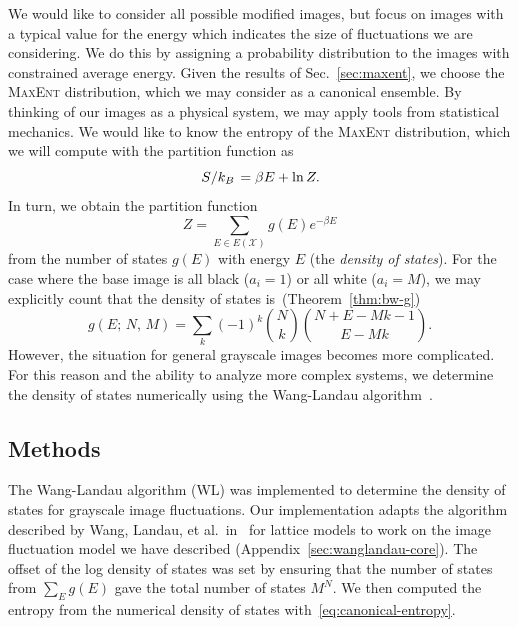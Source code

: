 \documentclass[aps,reprint,floatfix]{revtex4-2}
\renewcommand\mathrm\textnormal%
\theoremstyle{plain}
\theoremstyle{definition}
\renewcommand\ln{\operatorname{\mathrm{ln}}}
\begin{document}
We would like to consider all possible modified images, but focus on images with
a typical value for the energy which indicates the size of fluctuations we are
considering. We do this by assigning a probability distribution to the images
with constrained average energy. Given the results of Sec.~\ref{sec:maxent}, we
choose the \textsc{MaxEnt} distribution, which we may consider as a canonical
ensemble. By thinking of our images as a physical system, we may apply tools
from statistical mechanics. We would like to know the entropy of the
\textsc{MaxEnt} distribution, which we will compute with the partition function as
\begin{equation}
  \flatfrac{S}{k_B}
  = \beta E + \ln Z.
  \label{eq:canonical-entropy}
\end{equation}
In turn, we obtain the partition function
\begin{equation}
  Z
  = \sum_{E \in E(\mathcal{X})} g(E) e^{-\beta E}
  \label{eq:partition-function}
\end{equation}
from the number of states $g(E)$ with energy $E$ (the \emph{density of states}).
For the case where the base image is all black ($a_i = 1$) or all white ($a_i =
M$), we may explicitly count that the density of states
is~(Theorem~\ref{thm:bw-g})
\begin{equation}
  g(E;\, N,\, M)
  = \sum_k {(-1)}^k \binom{N}{k} \binom{N + E - Mk - 1}{E - Mk}.
  \label{eq:bw-g}
\end{equation}
However, the situation for general grayscale images becomes more complicated.
For this reason and the ability to analyze more complex systems, we determine
the density of states numerically using the Wang-Landau
algorithm~\cite{wanglandau}.

\subsection{Methods}\label{sec:wl-methods}

The Wang-Landau algorithm (WL) was implemented to determine the density of
states for grayscale image fluctuations. Our implementation adapts the algorithm
described by Wang, Landau, et al.\ in~\cite{wanglandau,wanglandau-ajp} for
lattice models to work on the image fluctuation model we have described
(Appendix~\ref{sec:wanglandau-core}). The offset of the log density of states
was set by ensuring that the number of states from $\sum_E g(E)$ gave the total
number of states $M^N$. We then computed the entropy from the numerical density
of states with~\eqref{eq:canonical-entropy}.
\end{document}
